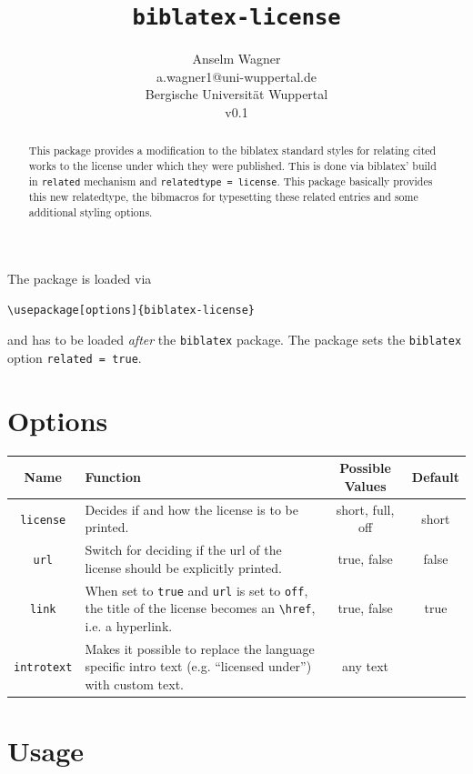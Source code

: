 \documentclass[11pt,oneside,notitlepage,a4paper,english,parskip=half*] {scrartcl}
\title{\texttt{biblatex-license}}
\author{Anselm Wagner\\a.wagner1@uni-wuppertal.de\\Bergische Universität Wuppertal\\v0.1}
\begin{document}
\maketitle
\begin{abstract}
This package provides a modification to the biblatex standard styles for relating cited works to the license under which they were published. This is done via biblatex' build in \texttt{related} mechanism and \texttt{relatedtype = license}. This package basically provides this new relatedtype, the bibmacros for typesetting these related entries and some additional styling options.
\end{abstract}
\tableofcontents
\vspace{2em}

The package is loaded via
\begin{verbatim}
\usepackage[options]{biblatex-license}
\end{verbatim}
and has to be loaded \emph{after} the \texttt{biblatex} package. The package sets the \texttt{biblatex} option \texttt{related = true}.

\section{Options}

\begin{tabularx}{\linewidth}{c|X|c|c}
\toprule \textbf{Name} & \textbf{Function}  & \textbf{Possible Values} & \textbf{Default} \\
\midrule \texttt{license} & Decides if and how the license is to be printed. & short, full, off & short \\
\hline \texttt{url} & Switch for deciding if the url of the license should be explicitly printed. & true, false & false \\
\hline \texttt{link} & When set to \texttt{true} and \texttt{url} is set to \texttt{off}, the title of the license becomes an \verb|\href|, i.e. a hyperlink. & true, false & true \\
\hline \texttt{introtext} & Makes it possible to replace the language specific intro text (e.g. \enquote{licensed under}) with custom text. & any text & \\\bottomrule
\end{tabularx}


\section{Usage}
\end{document}
